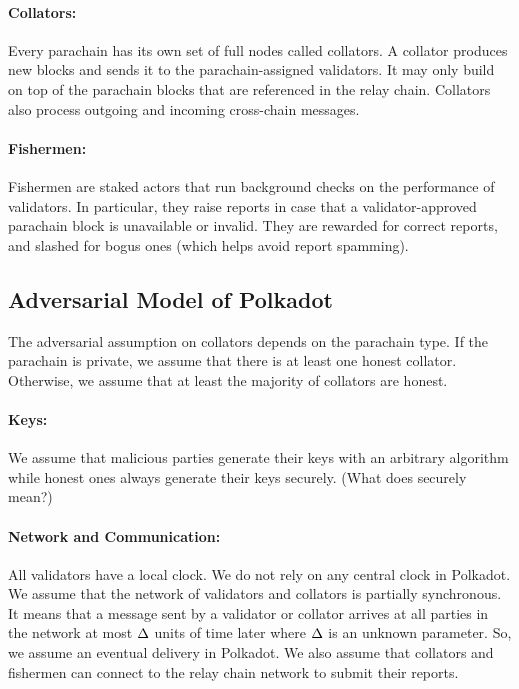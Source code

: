 \paragraph{Collators: } Every parachain has its own set of full nodes called collators. 
A collator produces new blocks and sends it to the parachain-assigned validators. 
It may only build on top of the parachain blocks that are referenced in the relay chain. 
Collators also process outgoing and incoming cross-chain messages.

\paragraph{Fishermen:} Fishermen are staked actors that run background checks on the performance of validators. 
In particular, they raise reports in case that a validator-approved parachain block is unavailable or invalid. 
They are rewarded for correct reports, and slashed for bogus ones (which helps avoid report spamming).

\subsection{Adversarial Model of Polkadot}

The adversarial assumption on collators depends on the parachain type. If the parachain is private, 
we assume that there is at least one honest collator. 
Otherwise, we assume that at least the majority of collators are honest.

\paragraph{Keys:} We assume that malicious parties generate their keys with an arbitrary algorithm 
while honest ones always generate their keys securely. (What does securely mean?)

\paragraph{Network and Communication:} All validators have a local clock. 
We do not rely on any central clock in Polkadot. 
We assume that the network of validators and collators is partially synchronous. 
It means that a message sent by a validator or collator arrives at all parties in the network 
at most $\Delta$ units of time later where $\Delta$ is an unknown parameter. So, we assume an eventual delivery in Polkadot.
We also assume that collators and fishermen can connect to the relay chain network to submit their reports.
